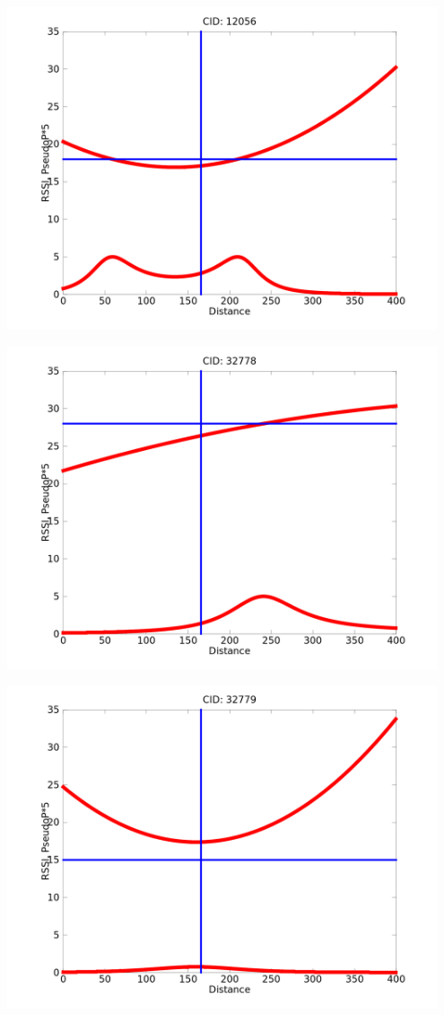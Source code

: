 \documentclass{beamer}
\begin{document}
{\begin{columns}[T]
		\begin{column}{0.32\textwidth}
			\includegraphics[width=0.95\textwidth]{cell12056pseudop-contrast.png}

			\includegraphics[width=0.95\textwidth]{cell32778pseudop-contrast.png}
	
			\includegraphics[width=0.95\textwidth]{cell32779pseudop-contrast.png}
		\end{column}
	\end{columns}

}
\end{document}
